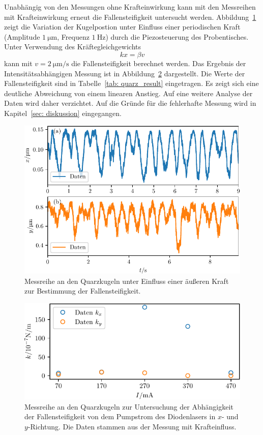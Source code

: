 \FloatBarrier
Unabhängig von den Messungen ohne Krafteinwirkung
kann mit den Messreihen mit Krafteinwirkung erneut die Fallensteifigkeit untersucht werden. Abbildung~\ref{fig: quarz_with_force} zeigt die
Variation der Kugelpostion unter Einfluss einer periodischen Kraft (Amplitude $\SI{1}{\micro\meter}$, Frequenz
$\SI{1}{\hertz}$) durch die Piezosteuerung des Probentisches. Unter Verwendung des Kräftegleichgewichts
\begin{equation}
  k x = \beta v
\end{equation}
kann mit $v = \SI{2}{\micro\meter\per\second}$ die Fallensteifigkeit berechnet werden. Das Ergebnis der
Intensitätsabhängigen Messung ist in Abbildung~\ref{fig: quarz_k_power_series_force} dargestellt. Die Werte der Fallensteifigkeit sind in
Tabelle~\ref{tab: quarz_result}
eingetragen. Es zeigt sich eine deutliche Abweichung von einem linearen Anstieg. Auf eine weitere Analyse der Daten wird daher verzichtet.
Auf die Gründe für die fehlerhafte Messung wird in Kapitel~\ref{sec: diskussion} eingegangen.
\begin{figure}
  \centering
  \includegraphics[scale = 1]{../analysis/data/i_quarz/70mA/results/with_force_70mA.pdf}
  \caption{Messreihe an den Quarzkugeln unter Einfluss einer äußeren Kraft zur Bestimmung der Fallensteifigkeit.  }
  \label{fig: quarz_with_force}
\end{figure}
\begin{figure}
  \centering
  \includegraphics[scale = 1]{../analysis/data/i_quarz/k_power_series_force.pdf}
  \caption{Messreihe an den Quarzkugeln zur Untersuchung der Abhängigkeit der Fallensteifigkeit von dem Pumpstrom des Diodenlasers
  in $x$- und $y$-Richtung. Die Daten stammen aus der Messung mit Krafteinfluss. }
  \label{fig: quarz_k_power_series_force}
\end{figure}

